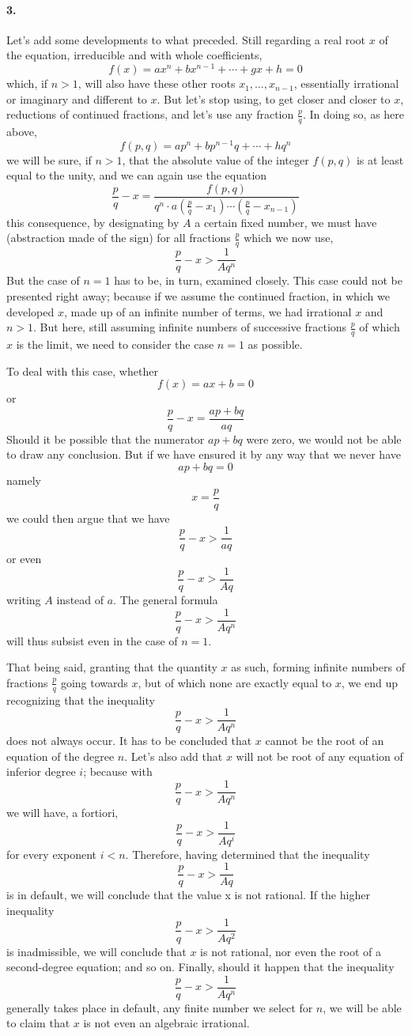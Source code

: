 \documentclass{article}
\begin{document}
\paragraph{3.}
Let’s add some developments to what preceded. Still regarding a real root $x$ of
the equation, irreducible and with whole coefficients,
$$f(x)=ax^n + bx^{n-1} + \cdots + gx + h = 0$$
which, if $n>1$, will also have these other roots $x_1, \ldots, x_{n-1}$,
essentially irrational or imaginary and different to $x$. But let’s stop using,
to get closer and closer to $x$, reductions of continued fractions, and let’s
use any fraction $\frac{p}{q}$. In doing so, as here above,
$$f(p,q) = ap^n + bp^{n-1} q + \cdots + hq^n$$
we will be sure, if $n>1$, that the absolute value of the integer $f(p,q)$ is
at least equal to the unity, and we can again use the equation
$$\frac{p}{q} - x = \frac{f(p, q)}{q^n\cdot a\left(\frac{p}{q} - x_1\right)
		\cdots\left(\frac{p}{q}- x_{n-1}\right)}$$
this consequence, by designating by $A$ a certain fixed number, we must have
(abstraction made of the sign) for all fractions $\frac{p}{q}$ which we now use,
$$\frac{p}{q} - x > \frac{1}{Aq^n}$$
But the case of $n=1$ has to be, in turn, examined closely. This case could not
be presented right away; because if we assume the continued fraction, in which
we developed $x$, made up of an infinite number of terms, we had irrational $x$
and $n > 1$. But here, still assuming infinite numbers of successive fractions
$\frac{p}{q}$ of which $x$ is the limit, we need to consider the case $n = 1$
as possible.

To deal with this case, whether
$$f(x) = ax + b = 0$$
or
$$\frac{p}{q} - x = \frac{ap + bq}{aq}$$
Should it be possible that the numerator $ap + bq$ were zero, we would not be
able to draw any conclusion. But if we have ensured it by any way that we never
have
$$ap + bq = 0$$
namely
$$x = \frac{p}{q}$$
we could then argue that we have
$$\frac{p}{q} - x > \frac{1}{aq}$$
or even
$$\frac{p}{q} - x > \frac{1}{Aq}$$
writing $A$ instead of $a$. The general formula
$$\frac{p}{q} - x > \frac{1}{Aq^n}$$
will thus subsist even in the case of $n=1$.

That being said, granting that the quantity $x$ as such, forming infinite
numbers of fractions $\frac{p}{q}$ going towards $x$, but of which none are
exactly equal to $x$, we end up recognizing that the inequality
$$\frac{p}{q} - x > \frac{1}{Aq^n}$$
does not always occur. It has to be concluded that $x$ cannot be the root of
an equation of the degree $n$. Let’s also add that $x$ will not be root of any
equation of inferior degree $i$; because with
$$\frac{p}{q} - x > \frac{1}{Aq^n}$$
we will have, a fortiori,
$$\frac{p}{q} - x > \frac{1}{Aq^i}$$
for every exponent $i < n$. Therefore, having determined that the inequality
$$\frac{p}{q} - x > \frac{1}{Aq}$$
is in default, we will conclude that the value x is not rational. If the higher
inequality
$$\frac{p}{q} - x > \frac{1}{Aq^2}$$
is inadmissible, we will conclude that $x$ is not rational, nor even the root
of a second-degree equation; and so on. Finally, should it happen that the
inequality
$$\frac{p}{q} - x > \frac{1}{Aq^n}$$
generally takes place in default, any finite number we select for $n$, we will
be able to claim that $x$ is not even an algebraic irrational.
\end{document}
